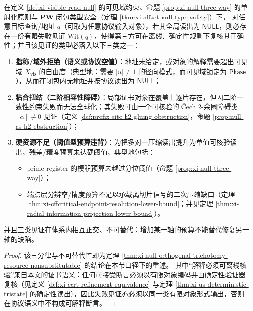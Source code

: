 \begin{theorem}\label{thm:xi-null-complete-trichotomy-offline}
在定义 \ref{def:xi-visible-read-null} 的可见域约束、命题 \ref{prop:xi-null-three-way} 的单射化原则与 \(\mathbf{PW}\) 闭包类型安全（定理 \ref{thm:xi-offset-null-type-safety}）下，
对任意目标查询/地址 \(q\)（可取为任意协议输入对象），若其全局读出为 \(\mathsf{NULL}\)，则必存在一份\textbf{有限}失败见证 \(\mathrm{Wit}(q)\)，使得第三方可在离线、确定性规则下复核其正确性；并且该见证的类型必落入以下三类之一：
\begin{enumerate}
  \item \textbf{指称/域外拒绝（语义或协议空值）}：地址未给定，或对象的解释需要超出可见域 \(X_{\mathrm{vis}}\) 的自由度（典型地：需要 \(|u|\neq 1\) 的径向模式，而可见域锁定为 \(\mathsf{Phase}\)），从而在闭包内无地址并按协议读出为 \(\mathsf{NULL}\)；
  \item \textbf{粘合扭结（二阶相容性障碍）}：局部证书对象在覆盖上逐片存在，但因二阶一致性约束失败而无法全球化；其失败可由一个可核验的 Čech \(2\)-余圈障碍类 \([\alpha]\neq 0\) 见证（定义 \ref{def:prefix-site-h2-gluing-obstruction}，命题 \ref{prop:null-as-h2-obstruction}）；
  \item \textbf{硬资源不足（阈值型预算违背）}：为把多对一压缩读出提升为单值可核验读出，残差/精度预算未达硬阈值，典型地包括：
  \begin{itemize}
    \item prime-register 的模积预算未越过分位阈值（命题 \ref{prop:xi-null-three-way}）；
    \item 端点层分辨率/精度预算不足以承载离切片信号的二次压缩缺口（定理 \ref{thm:xi-offcritical-endpoint-resolution-lower-bound}；并见定理 \ref{thm:xi-radial-information-projection-lower-bound}）。
  \end{itemize}
\end{enumerate}
并且三类见证在体系内相互正交、不可替代：增加某一轴的预算不能替代修复另一轴的缺陷。
\end{theorem}

\begin{proof}
该三分律与不可替代性即为定理 \ref{thm:xi-null-orthogonal-trichotomy-resource-nonsubstitutable} 的结论在本节口径下的重述。
其中“解释必须可离线核验”来自本文的证书语义：任何可接受断言必须以有限对象编码并由确定性验证器复核（见定义 \ref{def:xi-cert-refinement-equivalence} 与定理 \ref{thm:xi-us-deterministic-tristate} 的确定性读出），因此失败见证亦必须以同一类有限对象形式输出，否则在协议语义中不构成可解释断言。
\end{proof}

